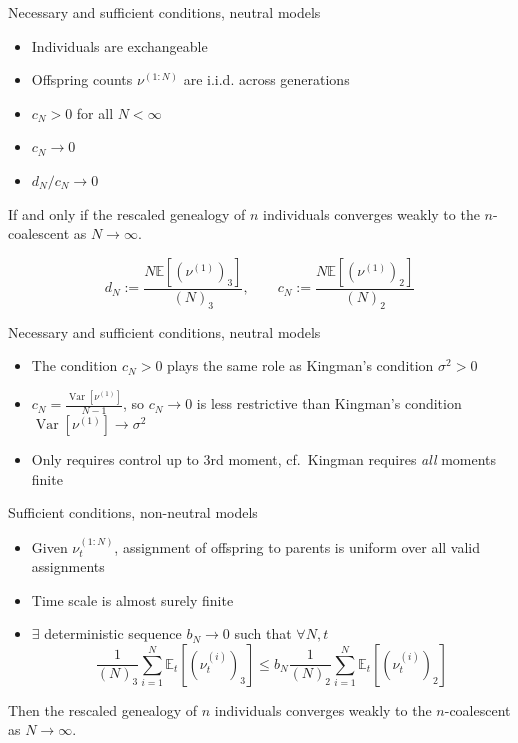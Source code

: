 \documentclass[aspectratio=169]{beamer}
\theoremstyle{definition}
\newcommand{\E}{\mathbb{E}}
\newcommand{\V}{\operatorname{Var}}
\begin{document}
\begin{frame}{Necessary and sufficient conditions, neutral models}
\begin{theorem}
\begin{itemize}
\item Individuals are exchangeable
\item Offspring counts $\nu^{(1:N)}$ are i.i.d. across generations
\item $c_N >0$ for all $N<\infty$
\item $c_N \longrightarrow 0$
\item $d_N/c_N \longrightarrow 0$
\end{itemize}
If and only if the rescaled genealogy of $n$ individuals converges weakly to the $n$-coalescent as $N\to\infty$.
\end{theorem}
\begin{equation*}
d_N := \frac{N \E[ ( \nu^{(1)} )_3 ] }{(N)_3}  ,\qquad
c_N := \frac{N \E[ ( \nu^{(1)} )_2 ] }{(N)_2} 
\end{equation*}
\end{frame}


\begin{frame}{Necessary and sufficient conditions, neutral models}
\begin{itemize}
\item The condition $c_N >0$ plays the same role as Kingman's condition $\sigma^2 >0$
\item $c_N = \frac{\V[\nu^{(1)}]}{N-1}$, so $c_N \to 0$ is less restrictive than Kingman's condition $\V[ \nu^{(1)} ] \to \sigma^2$
\item Only requires control up to 3rd moment, cf.\ Kingman requires \emph{all} moments finite
\end{itemize}
\end{frame}


\begin{frame}{Sufficient conditions, non-neutral models}
\begin{theorem}
\begin{itemize}
\item Given $\nu_t^{(1:N)}$, assignment of offspring to parents is uniform over all valid assignments
\item Time scale is almost surely finite
\item $\exists$ deterministic sequence $b_N \to 0$ such that $\forall N, t$
\begin{equation*}
\frac{1}{(N)_3} \sum_{i=1}^N \E_t[ (\nu_t^{(i)})_3 ]
\leq b_N \frac{1}{(N)_2} \sum_{i=1}^N \E_t[ (\nu_t^{(i)})_2 ]
\end{equation*}
\end{itemize}
Then the rescaled genealogy of $n$ individuals converges weakly to the $n$-coalescent as $N\to\infty$.
\end{theorem}
\end{frame}
\end{document}
